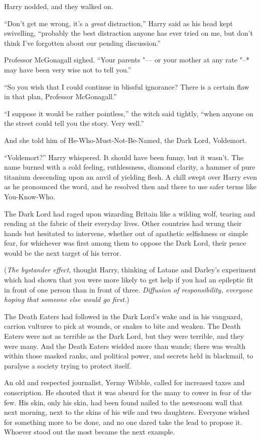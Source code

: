 Harry nodded, and they walked on.

``Don't get me wrong, it's a \emph{great} distraction,'' Harry said as
his head kept swivelling, ``probably the best distraction anyone has
ever tried on me, but don't think I've forgotten about our pending
discussion.''

Professor McGonagall sighed. ``Your parents "--- or your mother at any rate
"--* may have been very wise not to tell you.''

``So you wish that I could continue in blissful ignorance? There is a
certain flaw in that plan, Professor McGonagall.''

``I suppose it would be rather pointless,'' the witch said tightly,
``when anyone on the street could tell you the story. Very well.''

And she told him of He-Who-Must-Not-Be-Named, the Dark Lord, Voldemort.

``Voldemort?'' Harry whispered. It should have been funny, but it
wasn't. The name burned with a cold feeling, ruthlessness, diamond
clarity, a hammer of pure titanium descending upon an anvil of yielding
flesh. A chill swept over Harry even as he pronounced the word, and he
resolved then and there to use safer terms like You-Know-Who.

The Dark Lord had raged upon wizarding Britain like a wilding wolf,
tearing and rending at the fabric of their everyday lives. Other
countries had wrung their hands but hesitated to intervene, whether out
of apathetic selfishness or simple fear, for whichever was first among
them to oppose the Dark Lord, their peace would be the next target of
his terror.

(\emph{The bystander effect,} thought Harry, thinking of Latane and
Darley's experiment which had shown that you were more likely to get
help if you had an epileptic fit in front of one person than in front of
three. \emph{Diffusion of responsibility, everyone hoping that someone
else would go first.})

The Death Eaters had followed in the Dark Lord's wake and in his
vanguard, carrion vultures to pick at wounds, or snakes to bite and
weaken. The Death Eaters were not as terrible as the Dark Lord, but they
were terrible, and they were many. And the Death Eaters wielded more
than wands; there was wealth within those masked ranks, and political
power, and secrets held in blackmail, to paralyse a society trying to
protect itself.

An old and respected journalist, Yermy Wibble, called for increased
taxes and conscription. He shouted that it was absurd for the many to
cower in fear of the few. His skin, only his skin, had been found nailed
to the newsroom wall that next morning, next to the skins of his wife
and two daughters. Everyone wished for something more to be done, and no
one dared take the lead to propose it. Whoever stood out the most became
the next example.


